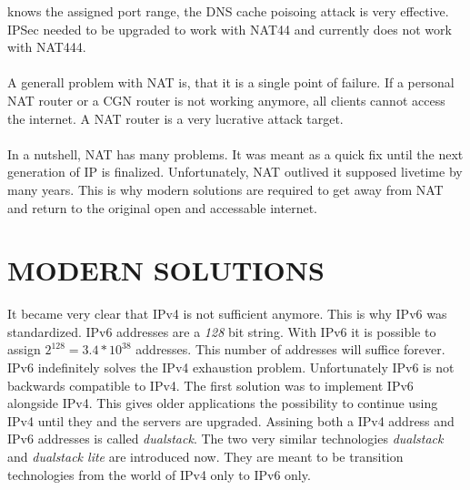 \documentclass[format=sigconf, natbib=true, nonacm=true]{acmart}
\begin{document}
knows the assigned port range, the DNS cache poisoing attack is very effective. IPSec needed to be upgraded to work with NAT44 and currently does not work with NAT444\cite{Hughes2022_C04}.\\\\A generall problem with NAT is, that it is a single point of failure. If a personal NAT router or a CGN router is not working anymore, all clients cannot access the internet. A NAT router is a very lucrative attack target\cite{Hughes2022_C04}.\\\\In a nutshell, NAT has many problems. It was meant as a quick fix until the next generation of IP is finalized. Unfortunately, NAT outlived it supposed livetime by many years. This is why modern solutions are required to get away from NAT and return to the original open and accessable internet.
    \section{MODERN SOLUTIONS}
    It became very clear that IPv4 is not sufficient anymore. This is why IPv6 was standardized. IPv6 addresses are a \textit{128} bit string. With IPv6 it is possible to assign $2^{128}=3.4*10^{38}$ addresses. This number of addresses will suffice forever. IPv6 indefinitely solves the IPv4 exhaustion problem. Unfortunately IPv6 is not backwards compatible to IPv4. The first solution was to implement IPv6 alongside IPv4. This gives older applications the possibility to continue using IPv4 until they and the servers are upgraded. Assining both a IPv4 address and IPv6 addresses is called \textit{dualstack}. The two very similar technologies \textit{dualstack} and \textit{dualstack lite} are introduced now. They are meant to be transition technologies from the world of IPv4 only to IPv6 only.
\end{document}

